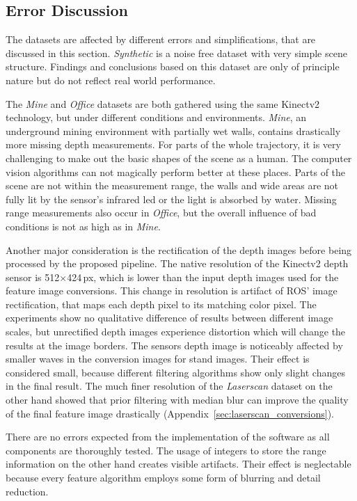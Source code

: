 \subsection{Error Discussion}

The datasets are affected by different errors and simplifications, that are discussed in this section.
\emph{Synthetic} is a noise free dataset with very simple scene structure.
Findings and conclusions based on this dataset are only of principle nature but do not reflect real world performance.

The \emph{Mine} and \emph{Office} datasets are both gathered using the same Kinectv2 technology, but under different conditions and environments.
\emph{Mine}, an underground mining environment with partially wet walls, contains drastically more missing depth measurements.
For parts of the whole trajectory, it is very challenging to make out the basic shapes of the scene as a human.
The computer vision algorithms can not magically perform better at these places.
Parts of the scene are not within the measurement range, the walls and wide areas are not fully lit by the sensor's infrared \acrshort{led} or the light is absorbed by water.
Missing range measurements also occur in \emph{Office}, but the overall influence of bad conditions is not as high as in \emph{Mine}.

Another major consideration is the rectification of the depth images before being processed by the proposed pipeline.
The native resolution of the Kinectv2 depth sensor is 512$\times$424\,px\cite{wasenmuller_accv2016}, which is lower than the input depth images used for the feature image conversions.
This change in resolution is artifact of \acrshort{ROS}' image rectification, that maps each depth pixel to its matching color pixel.
The experiments show no qualitative difference of results between different image scales, but unrectified depth images experience distortion which will change the results at the image borders.
The sensors depth image is noticeably affected by smaller waves in the conversion images for stand images.
Their effect is considered small, because different filtering algorithms show only slight changes in the final result.
The much finer resolution of the \emph{Laserscan} dataset on the other hand showed that prior filtering with median blur can improve the quality of the final feature image drastically (Appendix~\ref{sec:laserscan_conversions}).

There are no errors expected from the implementation of the software as all components are thoroughly tested.
The usage of integers to store the range information on the other hand creates visible artifacts.
Their effect is neglectable because every feature algorithm employs some form of blurring and detail reduction.
